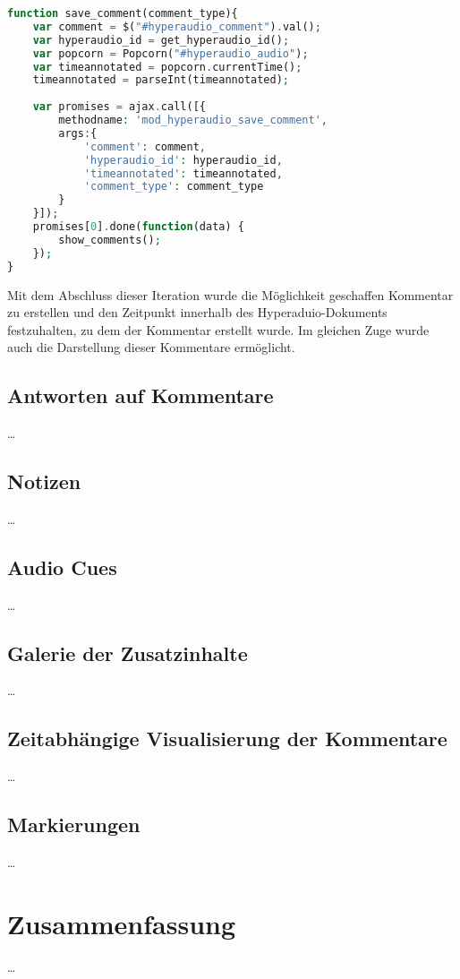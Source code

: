 \begin{lstlisting}[language=php,
             linewidth=\textwidth,
             caption={Ausschnitt der \textbf{comments.js} in der 5. Iteration},
             label={lst:it5:comments}]
function save_comment(comment_type){
	var comment = $("#hyperaudio_comment").val();
	var hyperaudio_id = get_hyperaudio_id();
	var popcorn = Popcorn("#hyperaudio_audio");
	var timeannotated = popcorn.currentTime();
	timeannotated = parseInt(timeannotated);
	    
	var promises = ajax.call([{
		methodname: 'mod_hyperaudio_save_comment',
		args:{
			'comment': comment,
			'hyperaudio_id': hyperaudio_id,       
			'timeannotated': timeannotated,
			'comment_type': comment_type
		}
	}]);
	promises[0].done(function(data) {
		show_comments();
	});
}
\end{lstlisting}

Mit dem Abschluss dieser Iteration wurde die Möglichkeit geschaffen Kommentar zu erstellen und den Zeitpunkt innerhalb des Hyperaduio-Dokuments festzuhalten, zu dem der Kommentar erstellt wurde. Im gleichen Zuge wurde auch die Darstellung dieser Kommentare ermöglicht.

\subsection{Antworten auf Kommentare}
\dots

\subsection{Notizen}
\dots

\subsection{Audio Cues}
\dots

\subsection{Galerie der Zusatzinhalte}
\dots

\subsection{Zeitabhängige Visualisierung der Kommentare}
\dots

\subsection{Markierungen}
\dots

%


\section{Zusammenfassung}
\dots